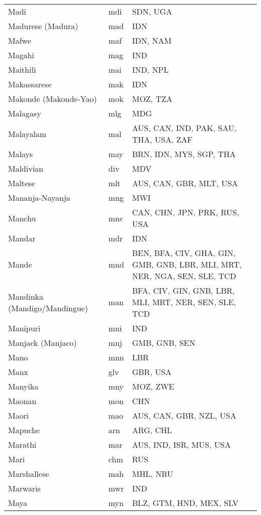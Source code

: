 \documentclass[12pt]{article}
\begin{document}
\begin{center}
\begin{longtable}{|p{7cm}|p{1cm}|p{7cm}|}
Madi	&	mdi	&	SDN, UGA	\\	\cline{1-3}
Madurese (Madura)	&	mad 	&	IDN	\\	\cline{1-3}
Mafwe	&	maf	&	IDN, NAM	\\	\cline{1-3}
Magahi	&	mag 	&	IND	\\	\cline{1-3}
Maithili	&	mai 	&	IND, NPL	\\	\cline{1-3}
Makassarese	&	mak 	&	IDN	\\	\cline{1-3}
Makonde (Makonde-Yao)	&	mok	&	MOZ, TZA	\\	\cline{1-3}
Malagasy	&	mlg 	&	MDG	\\	\cline{1-3}
Malayalam	&	mal 	&	AUS, CAN, IND, PAK, SAU, THA, USA, ZAF	\\	\cline{1-3}
Malays	&	may	&	BRN, IDN, MYS, SGP, THA	\\	\cline{1-3}
Maldivian	&	div 	&	MDV	\\	\cline{1-3}
Maltese	&	mlt 	&	AUS, CAN, GBR, MLT, USA 	\\	\cline{1-3}
Mananja-Nayanja	&	mng	&	MWI	\\	\cline{1-3}
Manchu	&	mnc 	&	CAN, CHN, JPN, PRK, RUS, USA	\\	\cline{1-3}
Mandar	&	mdr 	&	IDN	\\	\cline{1-3}
Mande	&	mnd	&	BEN, BFA, CIV, GHA, GIN, GMB, GNB, LBR, MLI, MRT, NER, NGA, SEN, SLE, TCD	\\	\cline{1-3}
Mandinka (Mandigo/Mandingue)	&	man 	&	BFA, CIV, GIN, GNB, LBR, MLI, MRT, NER, SEN, SLE, TCD	\\	\cline{1-3}
Manipuri	&	mni 	&	IND	\\	\cline{1-3}
Manjack (Manjaco)	&	mnj	&	GMB, GNB, SEN	\\	\cline{1-3}
Mano	&	mnn	&	LBR	\\	\cline{1-3}
Manx	&	glv 	&	GBR, USA	\\	\cline{1-3}
Manyika	&	mny	&	MOZ, ZWE	\\	\cline{1-3}
Maonan	&	mon	&	CHN	\\	\cline{1-3}
Maori	&	mao 	&	AUS, CAN, GBR, NZL, USA	\\	\cline{1-3}
Mapuche	&	arn 	&	ARG, CHL	\\	\cline{1-3}
Marathi	&	mar 	&	AUS, IND, ISR, MUS, USA	\\	\cline{1-3}
Mari	&	chm 	&	RUS	\\	\cline{1-3}
Marshallese	&	mah 	&	MHL, NRU	\\	\cline{1-3}
Marwaris	&	mwr 	&	IND	\\	\cline{1-3}
Maya	&	myn 	&	BLZ, GTM, HND, MEX, SLV	\\	\cline{1-3}

\end{longtable}
\end{center}
\end{document}
